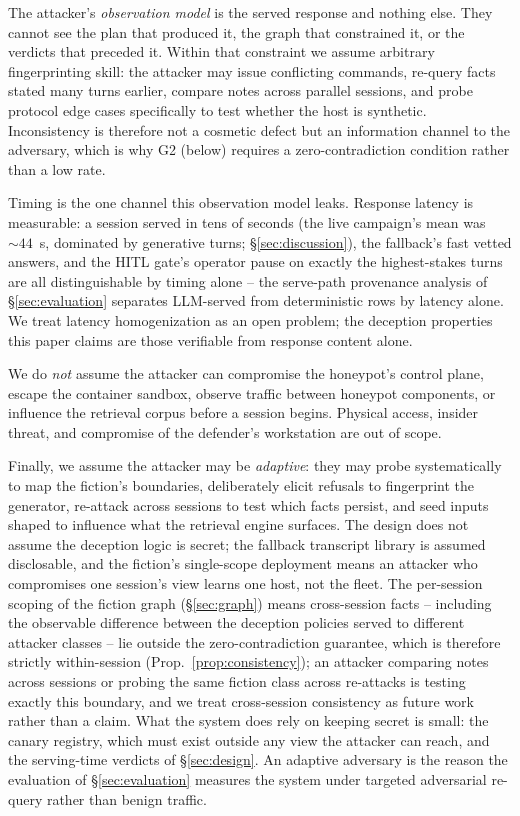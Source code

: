The attacker's \emph{observation model} is the served response and
nothing else. They cannot see the plan that produced it, the graph that
constrained it, or the verdicts that preceded it. Within that constraint
we assume arbitrary fingerprinting skill: the attacker may issue
conflicting commands, re-query facts stated many turns earlier, compare
notes across parallel sessions, and probe protocol edge cases
specifically to test whether the host is synthetic. Inconsistency is
therefore not a cosmetic defect but an information channel to the
adversary, which is why G2 (below) requires a zero-contradiction
condition rather than a low rate.

Timing is the one channel this observation model leaks. Response
latency is measurable: a session served in tens of seconds (the live
campaign's mean was ${\sim}44$~s, dominated by generative turns;
\S\ref{sec:discussion}), the fallback's fast vetted answers, and the
HITL gate's operator pause on exactly the highest-stakes turns are all
distinguishable by timing alone -- the serve-path provenance analysis
of \S\ref{sec:evaluation} separates LLM-served from deterministic rows
by latency alone. We treat latency homogenization as an open problem;
the deception properties this paper claims are those verifiable from
response content alone.

We do \emph{not} assume the attacker can compromise the honeypot's
control plane, escape the container sandbox, observe traffic between
honeypot components, or influence the retrieval corpus before a session
begins. Physical access, insider threat, and compromise of the defender's
workstation are out of scope.

Finally, we assume the attacker may be \emph{adaptive}: they may probe
systematically to map the fiction's boundaries, deliberately elicit
refusals to fingerprint the generator, re-attack across sessions to test
which facts persist, and seed inputs shaped to influence what the
retrieval engine surfaces. The design does not assume the deception
logic is secret; the fallback transcript library is assumed
disclosable, and the fiction's single-scope deployment means an attacker
who compromises one session's view learns one host, not the fleet. The
per-session scoping of the fiction graph (\S\ref{sec:graph}) means
cross-session facts -- including the observable difference between the
deception policies served to different attacker classes -- lie outside
the zero-contradiction guarantee, which is therefore strictly
within-session (Prop.~\ref{prop:consistency}); an attacker comparing
notes across sessions or probing the same fiction class across
re-attacks is testing exactly this boundary, and we treat cross-session
consistency as future work rather than a claim. What
the system does rely on keeping secret is small: the canary registry,
which must exist outside any view the attacker can reach, and the
serving-time verdicts of \S\ref{sec:design}. An adaptive adversary is
the reason the evaluation of \S\ref{sec:evaluation} measures the system
under targeted adversarial re-query rather than benign traffic.

